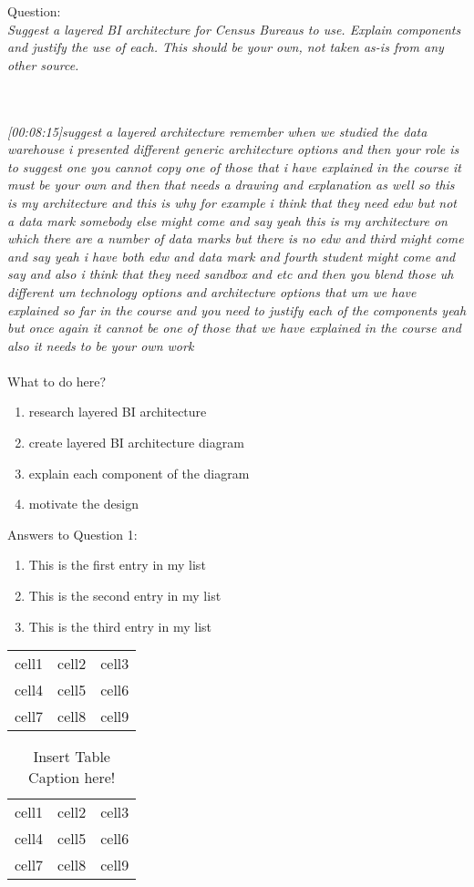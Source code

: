 Question\cite{CourseLitt}:\\
\emph{Suggest a layered BI architecture for Census Bureaus to use. Explain components and
justify the use of each. This should be your own, not taken as-is from any other source.}

\\\\
\emph{[00:08:15]suggest a layered architecture remember when we studied the data warehouse i presented
different generic architecture options and then your role is to suggest one you cannot copy one of those that i have explained in the course it must be your own
and then that needs a drawing and explanation as well so this is my architecture and this is why for example
i think that they need edw but not a data mark somebody else might come and say
yeah this is my architecture on which there are a number of data marks but there is no edw and third might come
and say yeah i have both edw and data mark and fourth student might come and say and also i think that they need sandbox and etc and then you blend those
uh different um technology options and architecture options that um we have explained so far in the course and you need to justify each of the components
yeah but once again it cannot be one of those that we have explained in the course and also it needs to be your own work}\\\\
What to do here?
\begin{enumerate}
    \item research layered BI architecture
    \item create layered BI architecture diagram
    \item explain each component of the diagram
    \item motivate the design
  \end{enumerate}

\newpage Answers to Question 1:

\newpage 
\begin{enumerate}
  \item This is the first entry in my list
  \item This is the second entry in my list
  \item This is the third entry in my list
\end{enumerate}

\begin{center}
    \begin{tabular}{ c c c }
        cell1 & cell2 & cell3 \\ 
        cell4 & cell5 & cell6 \\  
        cell7 & cell8 & cell9    
    \end{tabular}
\end{center}

\begin{table}[h]
\centering
    \begin{tabular}{ |c| c| c| }
     \hline
        cell1 & cell2 & cell3 \\ 
        cell4 & cell5 & cell6 \\  
        cell7 & cell8 & cell9 \\  
     \hline
    \end{tabular}\\
    \caption{Insert Table Caption here!}
    \label{table:1}
\end{table}